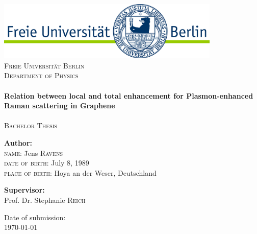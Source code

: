 
\begin{titlepage}

\begin{center}

\includegraphics[width=0.8\textwidth]{./images/free-university.jpg}\\[1cm]

\textsc{\LARGE Freie Universität Berlin}\\[0.3cm]
\textsc{\LARGE Department of Physics}\\[1.5cm]
\HRule \\[0.4cm]
{ \huge \bfseries \linespread{1.5} Relation between local and total enhancement for Plasmon-enhanced Raman scattering in Graphene}\\[0.4cm]

\HRule \\[1cm]

\textsc{\Large Bachelor Thesis}\\[2cm]

\begin{flushleft} \large
\begin{tabbing}
\textbf{Author:}\\
\textsc{name:} \hspace{3cm} \= Jens \textsc{Ravens} \\
\textsc{date of birth:} \> July 8, 1989 \\
\textsc{place of birth:} \> Hoya an der Weser, Deutschland
\end{tabbing}
\end{flushleft}
\begin{flushleft} \large
\textbf{Supervisor:} \\
Prof. Dr. Stephanie \textsc{Reich}
\end{flushleft}

\vfill

{\large Date of submission: \\ \today}

\end{center}

\end{titlepage}
